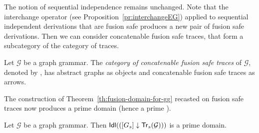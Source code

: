 The notion of sequential independence remains unchanged. Note that the interchange operator (see Proposition~\ref{pr:interchangeEG}) 
applied to sequential independent derivations that are fusion safe produces a new pair of fusion safe 
derivations. 
%
Then we can consider concatenable fusion safe traces, that form a subcategory of the category of traces.

\begin{definition}
  \label{de:abs-shift-cat-2}
  Let $\mathcal{G}$ be a graph grammar.  The \emph{category of
    concatenable fusion safe traces} of $\mathcal{G}$, denoted by
  , has abstract graphs as objects and concatenable
  fusion safe traces as arrows.
\end{definition}

The construction of Theorem~\ref{th:fusion-domain-for-gg} recasted on
fusion safe traces now produces a prime domain (hence a
prime {\esabbr}).

\begin{theorem}
  Let $\mathcal{G}$ be a graph grammar. Then
  $\mathsf{Idl}({({[G_s]} \downarrow {\ensuremath{\mathsf{Tr}_s({\mathcal{G}})}})})$ is a prime domain.
\end{theorem}

